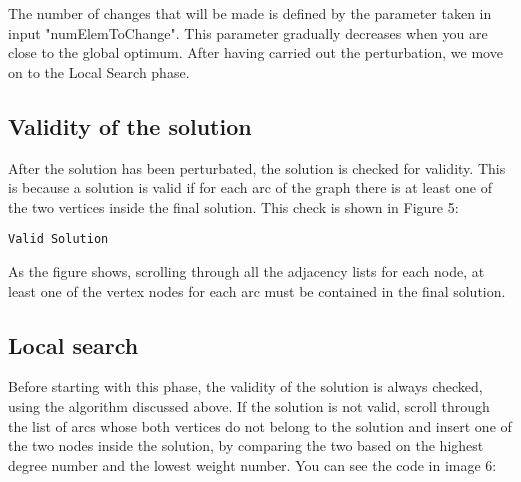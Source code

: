 \documentclass[11pt, oneside]{article}
\begin{document}
The number of changes that will be made is defined by the parameter taken in input "numElemToChange". This parameter gradually decreases when you are close to the global optimum.
After having carried out the perturbation, we move on to the Local Search phase.

\pagebreak


\subsection{Validity of the solution}

\qquad

\qquad


After the solution has been perturbated, the solution is checked for validity. This is because a solution is valid if for each arc of the graph there is at least one of the two vertices inside the final solution. This check is shown in Figure 5:

\qquad

\qquad

\begin{algorithm}
    \caption{\texttt{Valid Solution}}
    \begin{algorithmic}
			\EndIf{}
     		\EndFor{}
	\EndFor{}
    \end{algorithmic}
    \end{algorithm}


\qquad

As the figure shows, scrolling through all the adjacency lists for each node, at least one of the vertex nodes for each arc must be contained in the final solution.

\qquad

\qquad

\qquad

\qquad

\qquad


\subsection{Local search}

Before starting with this phase, the validity of the solution is always checked, using the algorithm discussed above. If the solution is not valid, scroll through the list of arcs whose both vertices do not belong to the solution and insert one of the two nodes inside the solution, by comparing the two based on the highest degree number and the lowest weight number. You can see the code in image 6:
\end{document}
